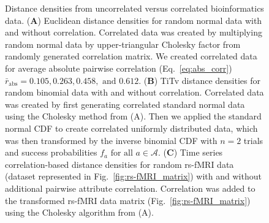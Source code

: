 \documentclass[aos]{imsart}
\begin{document}

\begin{figure}[H]
	\centering
	\caption{Distance densities from uncorrelated versus correlated bioinformatics data. (\textbf{A}) Euclidean distance densities for random normal data with and without correlation. Correlated data was created by multiplying random normal data by upper-triangular Cholesky factor from randomly generated correlation matrix. We created correlated data for average absolute pairwise correlation (Eq.~\ref{eq:abs_corr}) $\bar{r}_\text{abs} = 0.105, 0.263, 0.458, \text{ and } 0.612$. (\textbf{B}) TiTv distance densities for random binomial data with and without correlation. Correlated data was created by first generating correlated standard normal data using the Cholesky method from (A). Then we applied the standard normal CDF to create correlated uniformly distributed data, which was then transformed by the inverse binomial CDF with $n=2$ trials and success probabilities $f_a \text{ for all } a \in \mathcal{A}$. (\textbf{C}) Time series correlation-based distance densities for random rs-fMRI data (dataset represented in Fig.~\ref{fig:rs-fMRI_matrix}) with and without additional pairwise attribute correlation. Correlation was added to the transformed rs-fMRI data matrix (Fig.~\ref{fig:rs-fMRI_matrix}) using the Cholesky algorithm from (A).}\label{fig:null_vs_correlated_ridge}
\end{figure}
\end{document}
